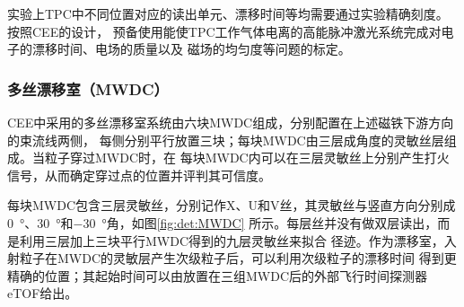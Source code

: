 \documentclass[bachelor,openany,oneside,color]{buaathesis}
\begin{document}
实验上TPC中不同位置对应的读出单元、漂移时间等均需要通过实验精确刻度。按照CEE的设计，
预备使用能使TPC工作气体电离的高能脉冲激光系统完成对电子的漂移时间、电场的质量以及
磁场的均匀度等问题的标定。

\subsubsection{多丝漂移室（MWDC）}

CEE中采用的多丝漂移室系统由六块MWDC组成，分别配置在上述磁铁下游方向的束流线两侧，
每侧分别平行放置三块；每块MWDC由三层成角度的灵敏丝层组成。当粒子穿过MWDC时，在
每块MWDC内可以在三层灵敏丝上分别产生打火信号，从而确定穿过点的位置并评判其可信度。

每块MWDC包含三层灵敏丝，分别记作X、U和V丝，其灵敏丝与竖直方向分别成
\SI{0}{\degree}、\SI{30}{\degree}和\SI{-30}{\degree}角，如图\ref{fig:det:MWDC}
所示。每层丝并没有做双层读出，而是利用三层加上三块平行MWDC得到的九层灵敏丝来拟合
径迹。作为漂移室，入射粒子在MWDC的灵敏层产生次级粒子后，可以利用次级粒子的漂移时间
得到更精确的位置；其起始时间可以由放置在三组MWDC后的外部飞行时间探测器eTOF给出。
\end{document}
